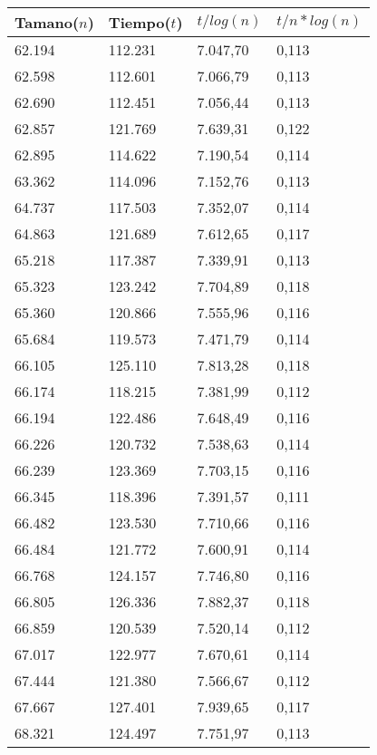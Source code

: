 \begin{table}[H]
\parbox{0.3\textwidth}{
  \begin{tabular}{| l | l | l |l |}
    \hline
    Tamano($n$) & Tiempo($t$) & $t / log(n)$ & $t / n*log(n)$ \\ \hline
62.194	&	112.231	&	7.047,70	&	0,113	\\ \hline
62.598	&	112.601	&	7.066,79	&	0,113	\\ \hline
62.690	&	112.451	&	7.056,44	&	0,113	\\ \hline
62.857	&	121.769	&	7.639,31	&	0,122	\\ \hline
62.895	&	114.622	&	7.190,54	&	0,114	\\ \hline
63.362	&	114.096	&	7.152,76	&	0,113	\\ \hline
64.737	&	117.503	&	7.352,07	&	0,114	\\ \hline
64.863	&	121.689	&	7.612,65	&	0,117	\\ \hline
65.218	&	117.387	&	7.339,91	&	0,113	\\ \hline
65.323	&	123.242	&	7.704,89	&	0,118	\\ \hline
65.360	&	120.866	&	7.555,96	&	0,116	\\ \hline
65.684	&	119.573	&	7.471,79	&	0,114	\\ \hline
66.105	&	125.110	&	7.813,28	&	0,118	\\ \hline
66.174	&	118.215	&	7.381,99	&	0,112	\\ \hline
66.194	&	122.486	&	7.648,49	&	0,116	\\ \hline
66.226	&	120.732	&	7.538,63	&	0,114	\\ \hline
66.239	&	123.369	&	7.703,15	&	0,116	\\ \hline
66.345	&	118.396	&	7.391,57	&	0,111	\\ \hline
66.482	&	123.530	&	7.710,66	&	0,116	\\ \hline
66.484	&	121.772	&	7.600,91	&	0,114	\\ \hline
66.768	&	124.157	&	7.746,80	&	0,116	\\ \hline
66.805	&	126.336	&	7.882,37	&	0,118	\\ \hline
66.859	&	120.539	&	7.520,14	&	0,112	\\ \hline
67.017	&	122.977	&	7.670,61	&	0,114	\\ \hline
67.444	&	121.380	&	7.566,67	&	0,112	\\ \hline
67.667	&	127.401	&	7.939,65	&	0,117	\\ \hline
68.321	&	124.497	&	7.751,97	&	0,113	\\ \hline

\end{tabular}}
\end{table}
